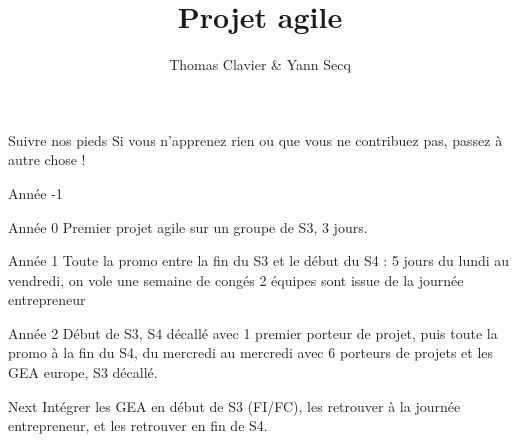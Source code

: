 \documentclass{beamer}
\title{Projet agile}
\author[Thomas Clavier, Yann Secq]
{
  Thomas Clavier \& Yann Secq 
}
\institute{
  \texttt{[image: logo\_iut\_A\_Lille.jpg]}
  \texttt{[image: Logo\_Univ\_de\_Lille.jpg]}
}
\date{}
\begin{document}
\frame{\titlepage}

\begin{frame}{Suivre nos pieds}
  \Large Si vous n’apprenez rien ou que vous ne contribuez pas, passez à autre chose !
\end{frame}

\begin{frame}{Année -1}
  
\end{frame}
\begin{frame}{Année 0}
  Premier projet agile sur un groupe de S3, 3 jours. 
\end{frame}
\begin{frame}{Année 1}
  Toute la promo entre la fin du S3 et le début du S4 : 5 jours du lundi au vendredi, on vole une semaine de congés
  2 équipes sont issue de la journée entrepreneur
\end{frame}
\begin{frame}{Année 2}
  Début de S3, S4 décallé avec 1 premier porteur de projet, puis toute la promo à la fin du S4, du mercredi au mercredi avec 6 porteurs de projets et les GEA europe, S3 décallé.
\end{frame}
\begin{frame}{Next}
  Intégrer les GEA en début de S3 (FI/FC), les retrouver à la journée entrepreneur, et les retrouver en fin de S4. 
\end{frame}
\end{document}
